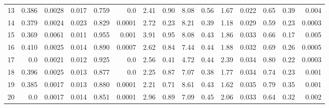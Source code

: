 \documentclass[areasetadvanced]{scrartcl}
\begin{document}
\begin{table}[H]
{\begin{tabular}{|r|r|r|r|r|r|r|r|r|r|r|r|r|r|r}
13 & 0.386 & 0.0028 & 0.017 & 0.759 & 0.0 & 2.41 & 0.90 & 8.08 & 0.56 & 1.67 & 0.022 & 0.65 & 0.39 & 0.004 \\
14 & 0.379 & 0.0024 & 0.023 & 0.829 & 0.0001 & 2.72 & 0.23 & 8.21 & 0.39 & 1.18 & 0.029 & 0.59 & 0.23 & 0.0003 \\
15 & 0.369 & 0.0061 & 0.011 & 0.955 & 0.001 & 3.91 & 0.95 & 8.08 & 0.43 & 1.86 & 0.033 & 0.66 & 0.17 & 0.005 \\
16 & 0.410 & 0.0025 & 0.014 & 0.890 & 0.0007 & 2.62 & 0.84 & 7.44 & 0.44 & 1.88 & 0.032 & 0.69 & 0.26 & 0.0005 \\
17 & 0.0 & 0.0021 & 0.012 & 0.925 & 0.0 & 2.56 & 0.41 & 4.72 & 0.44 & 2.39 & 0.034 & 0.80 & 0.22 & 0.0003 \\
18 & 0.396 & 0.0025 & 0.013 & 0.877 & 0.0 & 2.25 & 0.87 & 7.07 & 0.38 & 1.77 & 0.034 & 0.74 & 0.23 & 0.001 \\
19 & 0.385 & 0.0017 & 0.013 & 0.880 & 0.0001 & 2.21 & 0.71 & 8.61 & 0.43 & 1.62 & 0.035 & 0.79 & 0.35 & 0.001 \\
20 & 0.0 & 0.0017 & 0.014 & 0.851 & 0.0001 & 2.96 & 0.89 & 7.09 & 0.45 & 2.06 & 0.033 & 0.64 & 0.32 & 0.002 \\
\hline
\end{tabular}%
}
\end{table}
\end{document}
